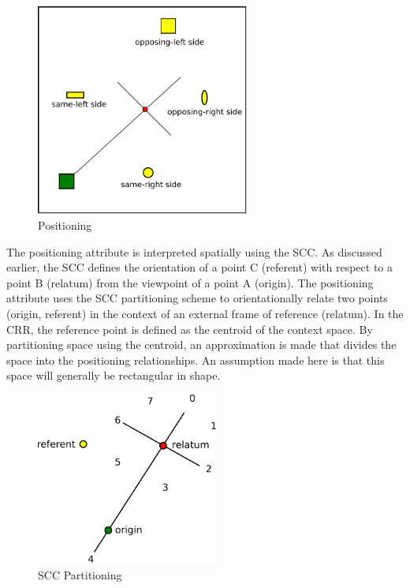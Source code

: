 \documentclass[12pt]{ucthesis}
\begin{document}
\begin{figure}[t]
\centering
\includegraphics[width=70mm]{position}
\caption{Positioning}
\label{position}
\end{figure}

The positioning attribute is interpreted spatially using the SCC. As discussed earlier, the SCC defines the orientation of a point C (referent) with respect to a point B (relatum) from the viewpoint of a point A (origin). The positioning attribute uses the SCC partitioning scheme to orientationally relate two points (origin, referent) in the context of an external frame of reference (relatum). In the CRR, the reference point is defined as the centroid of the context space. By partitioning space using the centroid, an approximation is made that divides the space into the positioning relationships. An assumption made here is that this space will generally be rectangular in shape.

\begin{figure}[H]
\centering
\includegraphics[width=60mm]{scc}
\caption{SCC Partitioning}
\label{scc}
\end{figure}
\end{document}
